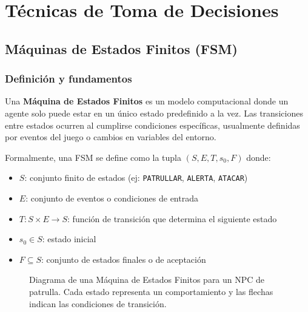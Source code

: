\documentclass[12pt,letterpaper]{article}
\begin{document}
\section{Técnicas de Toma de Decisiones}

\subsection{Máquinas de Estados Finitos (FSM)}

\subsubsection{Definición y fundamentos}

Una \textbf{Máquina de Estados Finitos} es un modelo computacional donde un agente solo puede estar en un único estado predefinido a la vez. Las transiciones entre estados ocurren al cumplirse condiciones específicas, usualmente definidas por eventos del juego o cambios en variables del entorno.

Formalmente, una FSM se define como la tupla \((S, E, T, s_0, F)\) donde:

\begin{itemize}[nosep]
  \item \(S\): conjunto finito de estados (ej: \texttt{PATRULLAR}, \texttt{ALERTA}, \texttt{ATACAR})
  \item \(E\): conjunto de eventos o condiciones de entrada
  \item \(T: S \times E \to S\): función de transición que determina el siguiente estado
  \item \(s_0 \in S\): estado inicial
  \item \(F \subseteq S\): conjunto de estados finales o de aceptación
\end{itemize}

\begin{figure}[H]
\centering
{}
\caption{Diagrama de una Máquina de Estados Finitos para un NPC de patrulla. Cada estado representa un comportamiento y las flechas indican las condiciones de transición.}
\end{figure}
\end{document}
